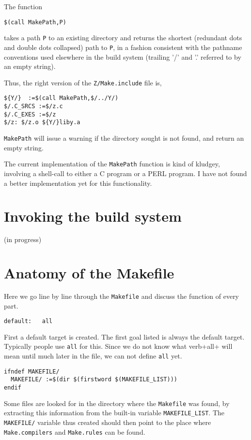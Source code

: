 \documentclass{article}
\begin{document}
The function
\begin{verbatim}
$(call MakePath,P)
\end{verbatim}
takes a path \verb+P+ to an existing directory
and returns the shortest (redundant dots and
double dots collapsed) path to \verb+P+, in a fashion
consistent with the pathname conventions used elsewhere
in the build system
(trailing '/' and '.' referred to by an empty string).

Thus, the right version of the \verb+Z/Make.include+ file is,
\begin{verbatim}
${Y/}  :=$(call MakePath,$/../Y/)
$/.C_SRCS :=$/z.c
$/.C_EXES :=$/z
$/z: $/z.o ${Y/}liby.a
\end{verbatim}
\verb+MakePath+ will issue a warning if the directory sought
is not found, and return an empty string.

The current implementation of the \verb+MakePath+ function is kind of
kludgey, involving a shell-call to either a C program or a PERL
program.  I have not found a better implementation yet for this
functionality.

\section{Invoking the build system}

(in progress)

\section{Anatomy of the Makefile}

Here we go line by line through the \verb+Makefile+ and discuss the function
of every part.

\begin{verbatim}
default:   all
\end{verbatim}
First a default target is created.  The first goal listed is always
the default target.  Typically people use \verb+all+ for this.  Since
we do not know what verb+all+ will mean until much later in the file,
we can not define \verb+all+ yet.

\begin{verbatim}
ifndef MAKEFILE/
  MAKEFILE/ :=$(dir $(firstword $(MAKEFILE_LIST)))
endif
\end{verbatim}
Some files are looked for in the directory where the
\verb+Makefile+ was found, by extracting this information from the
built-in variable \verb+MAKEFILE_LIST+.  The \verb+MAKEFILE/+ variable
thus created should then point to the place where \verb+Make.compilers+
and \verb+Make.rules+ can be found.
\end{document}
